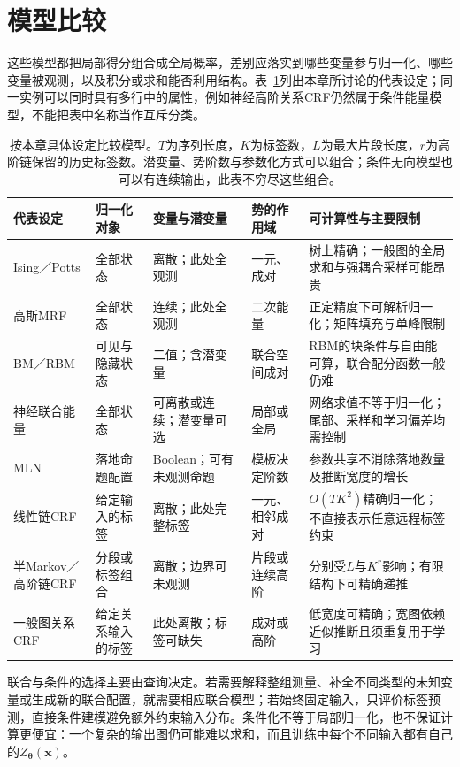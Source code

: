 \section{模型比较}
\label{sec:pgm-energy-models-comparison}

这些模型都把局部得分组合成全局概率，差别应落实到哪些变量参与归一化、哪些变量被观测，以及积分或求和能否利用结构。表~\ref{tab:pgm-energy-models-comparison}列出本章所讨论的代表设定；同一实例可以同时具有多行中的属性，例如神经高阶关系CRF仍然属于条件能量模型，不能把表中名称当作互斥分类。

\begin{table}[htbp]
  \centering
  \small
  \begin{tabularx}{\linewidth}{p{27mm}p{19mm}p{24mm}p{24mm}X}
    \toprule
    代表设定 & 归一化对象 & 变量与潜变量 & 势的作用域 & 可计算性与主要限制\\
    \midrule
    Ising／Potts & 全部状态 & 离散；此处全观测 & 一元、成对 & 树上精确；一般图的全局求和与强耦合采样可能昂贵\\
    高斯MRF & 全部状态 & 连续；此处全观测 & 二次能量 & 正定精度下可解析归一化；矩阵填充与单峰限制\\
    BM／RBM & 可见与隐藏状态 & 二值；含潜变量 & 联合空间成对 & RBM的块条件与自由能可算，联合配分函数一般仍难\\
    神经联合能量 & 全部状态 & 可离散或连续；潜变量可选 & 局部或全局 & 网络求值不等于归一化；尾部、采样和学习偏差均需控制\\
    MLN & 落地命题配置 & Boolean；可有未观测命题 & 模板决定阶数 & 参数共享不消除落地数量及推断宽度的增长\\
    线性链CRF & 给定输入的标签 & 离散；此处完整标签 & 一元、相邻成对 & $O(TK^2)$精确归一化；不直接表示任意远程标签约束\\
    半Markov／高阶链CRF & 分段或标签组合 & 离散；边界可未观测 & 片段或连续高阶 & 分别受$L$与$K^r$影响；有限结构下可精确递推\\
    一般图关系CRF & 给定关系输入的标签 & 此处离散；标签可缺失 & 成对或高阶 & 低宽度可精确；宽图依赖近似推断且须重复用于学习\\
    \bottomrule
  \end{tabularx}
  \caption{按本章具体设定比较模型。$T$为序列长度，$K$为标签数，$L$为最大片段长度，$r$为高阶链保留的历史标签数。潜变量、势阶数与参数化方式可以组合；条件无向模型也可以有连续输出，此表不穷尽这些组合。}
  \label{tab:pgm-energy-models-comparison}
\end{table}

联合与条件的选择主要由查询决定。若需要解释整组测量、补全不同类型的未知变量或生成新的联合配置，就需要相应联合模型；若始终固定输入，只评价标签预测，直接条件建模避免额外约束输入分布。条件化不等于局部归一化，也不保证计算更便宜：一个复杂的输出图仍可能难以求和，而且训练中每个不同输入都有自己的$Z_{\bm{\theta}}(\bm{x})$。

